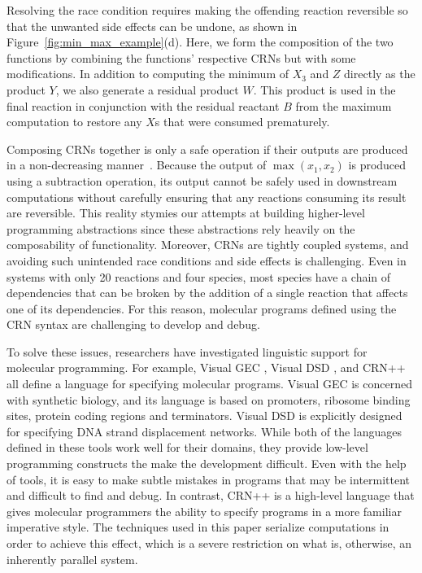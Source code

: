 Resolving the race condition requires making the offending reaction reversible so that the unwanted side effects can be undone, as shown in Figure~\ref{fig:min_max_example}(d).
Here, we form the composition of the two functions by combining the functions' respective CRNs but with some modifications.
In addition to computing the minimum of $X_3$ and $Z$ directly as the product $Y$, we also generate a residual product $W$.
This product is used in the final reaction in conjunction with the residual reactant $B$ from the maximum computation to restore any $X$s that were consumed prematurely.

Composing CRNs together is only a safe operation if their outputs are produced in a non-decreasing manner~\cite{jCKRS18,doty19}.
Because the output of \( \max(x_1, x_2) \) is produced using a subtraction operation, its output cannot be safely used in downstream computations without carefully ensuring that any reactions consuming its result are reversible.
This reality stymies our attempts at building higher-level programming abstractions since these abstractions rely heavily on the composability of functionality.
Moreover, CRNs are tightly coupled systems, and avoiding such unintended race conditions and side effects is challenging.
Even in systems with only 20 reactions and four species, most species have a chain of dependencies that can be broken by the addition of a single reaction that affects one of its dependencies.
For this reason, molecular programs defined using the CRN syntax are challenging to develop and debug.

To solve these issues, researchers have investigated linguistic support for molecular programming.
For example, Visual GEC \cite{jPedPhi09}, Visual DSD \cite{jLYPEP11}, and CRN++ \cite{khurshid2018} all define a language for specifying molecular programs.
Visual GEC is concerned with synthetic biology, and its language is based on promoters, ribosome binding sites, protein coding regions and terminators.
Visual DSD is explicitly designed for specifying DNA strand displacement networks.
While both of the languages defined in these tools work well for their domains, they provide low-level programming constructs the make the development difficult.
Even with the help of tools, it is easy to make subtle mistakes in programs that may be intermittent and difficult to find and debug.
In contrast, CRN++ is a high-level language that gives molecular programmers the ability to specify programs in a more familiar imperative style.
The techniques used in this paper serialize computations in order to achieve this effect, which is a severe restriction on what is, otherwise, an inherently parallel system.

